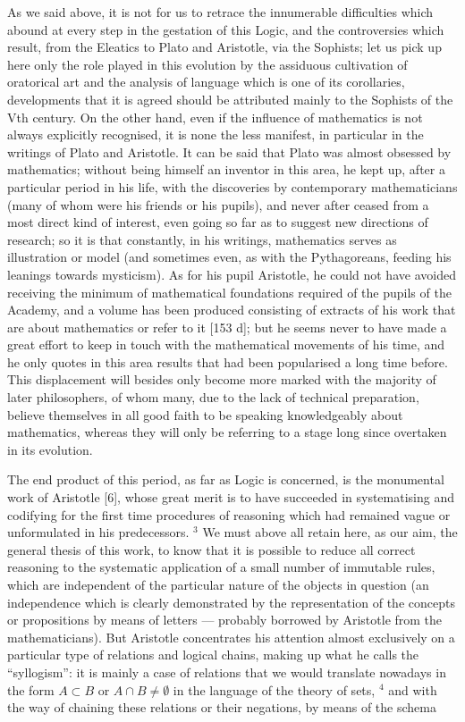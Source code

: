 As we said above, it is not for us to retrace the innumerable difficulties which abound at every step in the gestation of this Logic, and the controversies which result, from the Eleatics to Plato and Aristotle, via the Sophists; let us pick up here only the role played in this evolution by the assiduous cultivation of oratorical art and the analysis of language which is one of its corollaries, developments that it is agreed should be attributed mainly to the Sophists of the Vth century. On the other hand, even if the influence of mathematics is not always explicitly recognised, it is none the less manifest, in particular in the writings of Plato and Aristotle. It can be said that Plato was almost obsessed by mathematics; without being himself an inventor in this area, he kept up, after a particular period in his life, with the discoveries by contemporary mathematicians (many of whom were his friends or his pupils), and never after ceased from a most direct kind of interest, even going so far as to suggest new directions of research; so it is that constantly, in his writings, mathematics serves as illustration or model (and sometimes even, as with the Pythagoreans, feeding his leanings towards mysticism). As for his pupil Aristotle, he could not have avoided receiving the minimum of mathematical foundations required of the pupils of the Academy, and a volume has been produced consisting of extracts of his work that are about mathematics or refer to it {[}153 d{]}; but he seems never to have made a great effort to keep in touch with the mathematical movements of his time, and he only quotes in this area results that had been popularised a long time before. This displacement will besides only become more marked with the majority of later philosophers, of whom many, due to the lack of technical preparation, believe themselves in all good faith to be speaking knowledgeably about mathematics, whereas they will only be referring to a stage long since overtaken in its evolution.

The end product of this period, as far as Logic is concerned, is the monumental work of Aristotle {[}6{]}, whose great merit is to have succeeded in systematising and codifying for the first time procedures of reasoning which had remained vague or unformulated in his predecessors. \(^{3}\) We must above all retain here, as our aim, the general thesis of this work, to know that it is possible to reduce all correct reasoning to the systematic application of a small number of immutable rules, which are independent of the particular nature of the objects in question (an independence which is clearly demonstrated by the representation of the concepts or propositions by means of letters --- probably borrowed by Aristotle from the mathematicians). But Aristotle concentrates his attention almost exclusively on a particular type of relations and logical chains, making up what he calls the ``syllogism'': it is mainly a case of relations that we would translate nowadays in the form \(A \subset B\) or \(A \cap B \neq \emptyset\) in the language of the theory of sets, \(^{4}\) and with the way of chaining these relations or their negations, by means of the schema

